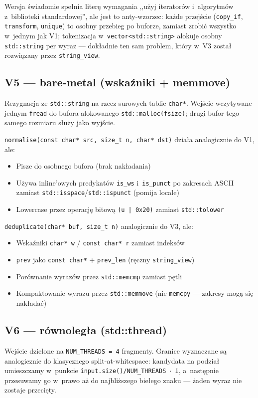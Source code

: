 \documentclass[11pt,a4paper]{article}
\begin{document}
Wersja świadomie spełnia literę wymagania ,,użyj iteratorów i~algorytmów z~biblioteki standardowej'', ale jest to anty-wzorzec: każde przejście (\texttt{copy\_if}, \texttt{transform}, \texttt{unique}) to osobny przebieg po buforze, zamiast zrobić wszystko w~jednym jak V1; tokenizacja w~\texttt{vector<std::string>} alokuje osobny \texttt{std::string} per wyraz --- dokładnie ten sam problem, który w~V3 został rozwiązany przez \texttt{string\_view}.

\subsection{V5 --- bare-metal (wskaźniki + memmove)}
Rezygnacja ze \texttt{std::string} na rzecz surowych tablic \texttt{char*}. Wejście wczytywane jednym \texttt{fread} do bufora alokowanego \texttt{std::malloc(fsize)}; drugi bufor tego samego rozmiaru służy jako wyjście.

\texttt{normalise(const char* src, size\_t n, char* dst)} działa analogicznie do V1, ale:
\begin{itemize}
    \item Pisze do osobnego bufora (brak nakładania)
    \item Używa inline'owych predykatów \texttt{is\_ws} i~\texttt{is\_punct} po zakresach ASCII zamiast \texttt{std::isspace}/\texttt{std::ispunct} (pomija locale)
    \item Lowercase przez operację bitową \texttt{(u | 0x20)} zamiast \texttt{std::tolower}
\end{itemize}

\texttt{deduplicate(char* buf, size\_t n)} analogicznie do V3, ale:
\begin{itemize}
    \item Wskaźniki \texttt{char* w} / \texttt{const char* r} zamiast indeksów
    \item \texttt{prev} jako \texttt{const char*} + \texttt{prev\_len} (ręczny \texttt{string\_view})
    \item Porównanie wyrazów przez \texttt{std::memcmp} zamiast pętli
    \item Kompaktowanie wyrazu przez \texttt{std::memmove} (nie \texttt{memcpy} --- zakresy mogą się nakładać)
\end{itemize}

\subsection{V6 --- równoległa (std::thread)}
Wejście dzielone na \texttt{NUM\_THREADS = 4} fragmenty. Granice wyznaczane są analogicznie do klasycznego split-at-whitespace: kandydata na podział umieszczamy w~punkcie \texttt{input.size()/NUM\_THREADS $\cdot$ i}, a~następnie przesuwamy go w~prawo aż do najbliższego biełego znaku --- żaden wyraz nie zostaje przecięty.
\end{document}
